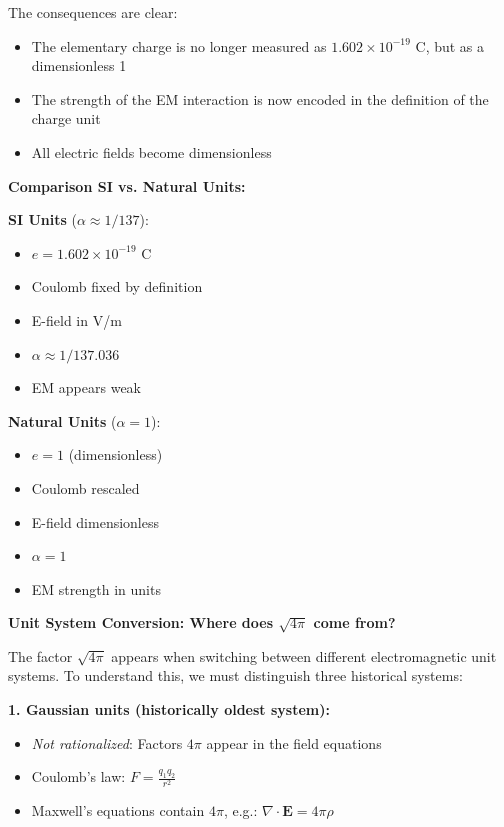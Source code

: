 The consequences are clear:
\begin{itemize}[nosep]
	\item The elementary charge is no longer measured as $1.602 \times 10^{-19}$ C, but as a dimensionless 1
	\item The strength of the EM interaction is now encoded in the definition of the charge unit
	\item All electric fields become dimensionless
\end{itemize}

\vspace{0.5cm}
\noindent
\textbf{Comparison SI vs. Natural Units:}

\vspace{0.3cm}
\noindent
\begin{minipage}[t]{0.48\textwidth}
	\textbf{SI Units} ($\alpha \approx 1/137$):
	\begin{itemize}[nosep]
		\item $e = 1.602 \times 10^{-19}$ C
		\item Coulomb fixed by definition
		\item E-field in V/m
		\item $\alpha \approx 1/137.036$
		\item EM appears weak
	\end{itemize}
\end{minipage}
\hfill
\begin{minipage}[t]{0.48\textwidth}
	\textbf{Natural Units} ($\alpha = 1$):
	\begin{itemize}[nosep]
		\item $e = 1$ (dimensionless)
		\item Coulomb rescaled
		\item E-field dimensionless
		\item $\alpha = 1$
		\item EM strength in units
	\end{itemize}
\end{minipage}
\vspace{0.5cm}

\textbf{Unit System Conversion: Where does $\sqrt{4\pi}$ come from?}

The factor $\sqrt{4\pi}$ appears when switching between different electromagnetic unit systems. To understand this, we must distinguish three historical systems:

\textbf{1. Gaussian units (historically oldest system):}
\begin{itemize}[nosep]
	\item \textit{Not rationalized}: Factors $4\pi$ appear in the field equations
	\item Coulomb's law: $F = \frac{q_1 q_2}{r^2}$
	\item Maxwell's equations contain $4\pi$, e.g.: $\nabla \cdot \mathbf{E} = 4\pi\rho$
\end{itemize}

